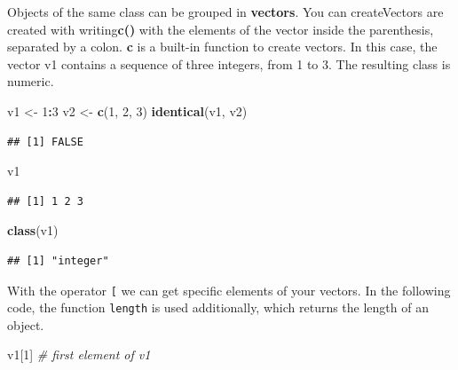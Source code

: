 \documentclass[12pt,graybox,envcountchap,sectrefs]{krantz}
\makeatletter
\newenvironment{Shaded}{\begin{snugshade}}{\end{snugshade}}
\newcommand{\KeywordTok}[1]{\textcolor[rgb]{0.13,0.29,0.53}{\textbf{#1}}}
\newcommand{\DecValTok}[1]{\textcolor[rgb]{0.00,0.00,0.81}{#1}}
\newcommand{\StringTok}[1]{\textcolor[rgb]{0.31,0.60,0.02}{#1}}
\newcommand{\CommentTok}[1]{\textcolor[rgb]{0.56,0.35,0.01}{\textit{#1}}}
\newcommand{\OperatorTok}[1]{\textcolor[rgb]{0.81,0.36,0.00}{\textbf{#1}}}
\newcommand{\NormalTok}[1]{#1}
\newenvironment{kframe}{%
\medskip{}
\setlength{\fboxsep}{.8em}
 \def\at@end@of@kframe{}%
 \ifinner\ifhmode%
  \def\at@end@of@kframe{\end{minipage}}%
  \begin{minipage}{\columnwidth}%
 \fi\fi%
 \def\FrameCommand##1{\hskip\@totalleftmargin \hskip-\fboxsep
 \colorbox{shadecolor}{##1}\hskip-\fboxsep
     \hskip-\linewidth \hskip-\@totalleftmargin \hskip\columnwidth}%
 \MakeFramed {\advance\hsize-\width
   \@totalleftmargin\z@ \linewidth\hsize
   \@setminipage}}%
 {\par\unskip\endMakeFramed%
 \at@end@of@kframe}
\renewenvironment{Shaded}{\begin{kframe}}{\end{kframe}}
\theoremstyle{definition}
\theoremstyle{definition}
\theoremstyle{definition}
\theoremstyle{remark}
\makeatother
\begin{document}
Objects of the same class can be grouped in \textbf{vectors}. You can
createVectors are created with writing\textbf{c()} with the elements of
the vector inside the parenthesis, separated by a colon. \textbf{c} is a
built-in function to create vectors. In this case, the vector v1
contains a sequence of three integers, from 1 to 3. The resulting class
is numeric.

\begin{Shaded}
\begin{Highlighting}[]
\NormalTok{v1 <-}\StringTok{ }\DecValTok{1}\OperatorTok{:}\DecValTok{3}
\NormalTok{v2 <-}\StringTok{ }\KeywordTok{c}\NormalTok{(}\DecValTok{1}\NormalTok{, }\DecValTok{2}\NormalTok{, }\DecValTok{3}\NormalTok{)}
\KeywordTok{identical}\NormalTok{(v1, v2)}
\end{Highlighting}
\end{Shaded}

\begin{verbatim}
## [1] FALSE
\end{verbatim}

\begin{Shaded}
\begin{Highlighting}[]
\NormalTok{v1}
\end{Highlighting}
\end{Shaded}

\begin{verbatim}
## [1] 1 2 3
\end{verbatim}

\begin{Shaded}
\begin{Highlighting}[]
\KeywordTok{class}\NormalTok{(v1)}
\end{Highlighting}
\end{Shaded}

\begin{verbatim}
## [1] "integer"
\end{verbatim}

With the operator \texttt{{[}} we can get specific elements of your
vectors. In the following code, the function \texttt{length} is used
additionally, which returns the length of an object.

\begin{Shaded}
\begin{Highlighting}[]
\NormalTok{v1[}\DecValTok{1}\NormalTok{]          }\CommentTok{# first element of v1}
\end{Highlighting}
\end{Shaded}
\end{document}
